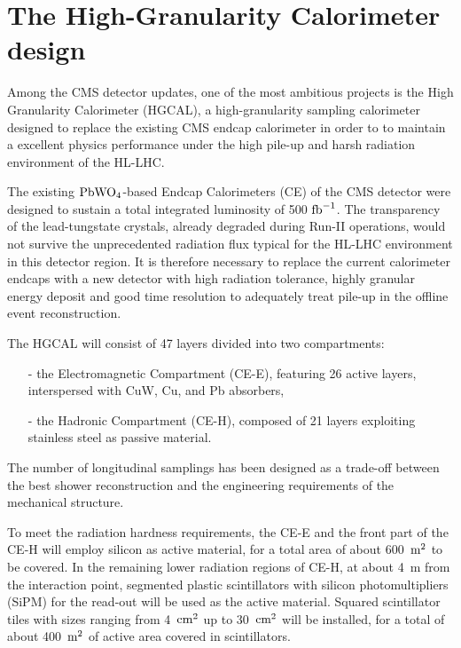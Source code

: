 
\section{The High-Granularity Calorimeter design}
\label{sec:The High-Granularity Calorimeter design}

Among the CMS detector updates, one of the most ambitious projects is the High Granularity Calorimeter (HGCAL), a high-granularity sampling calorimeter designed to replace the existing CMS endcap calorimeter in order to to maintain a excellent physics performance under the high pile-up and harsh radiation environment of the HL-LHC.

The existing $\textnormal{PbWO}_4$-based Endcap Calorimeters (CE) of the CMS detector were designed to sustain a total integrated luminosity of 500 $\textnormal{fb}^{-1}$. 
The transparency of the lead-tungstate crystals, already degraded during Run-II operations, would not survive the unprecedented radiation flux typical for the HL-LHC environment in this detector region.
It is therefore necessary to replace the current calorimeter endcaps with a new detector with high radiation tolerance, highly granular energy deposit and good time resolution to adequately treat pile-up in the offline event reconstruction. \newline

The HGCAL will consist of 47 layers divided into two compartments:
\begin{itemize}
    \item [-] the Electromagnetic Compartment (CE-E), featuring 26 active layers, interspersed with CuW, Cu, and Pb absorbers,
    \item [-] the Hadronic Compartment (CE-H), composed of 21 layers exploiting stainless steel as passive material.
\end{itemize}

The number of longitudinal samplings has been designed as a trade-off between the best shower reconstruction and the engineering requirements of the mechanical structure. 

To meet the radiation hardness requirements, the CE-E and the front part of the CE-H will employ silicon as active material, for a total area of about 600~$\textnormal{m}^2$ to be covered. In the remaining lower radiation regions of CE-H, at about 4~m from the interaction point, segmented plastic scintillators with silicon photomultipliers (SiPM) for the read-out will be used as the active material. Squared scintillator tiles with sizes ranging from 4~$\textnormal{cm}^2$ up to 30~$\textnormal{cm}^2$ will be installed, for a total of about 400~$\textnormal{m}^2$ of active area covered in scintillators.

